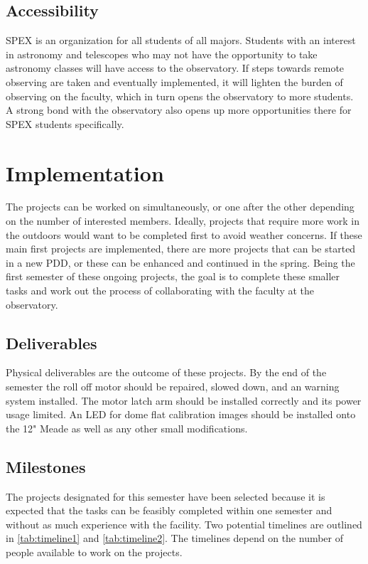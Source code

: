 \documentclass[conference]{IEEEtran} %
\begin{document}
\subsection{Accessibility}
\label{subsec:plug-n-play}
SPEX is an organization for all students of all majors.
Students with an interest in astronomy and telescopes who may not have the opportunity to take astronomy classes will have access to the observatory.
If steps towards remote observing are taken and eventually implemented, it will lighten the burden of observing on the faculty, which in turn opens the observatory to more students.
A strong bond with the observatory also opens up more opportunities there for SPEX students specifically.

\section{Implementation}
\label{sec:implementation}

 The projects can be worked on simultaneously, or one after the other depending on the number of interested members.
 Ideally, projects that require more work in the outdoors would want to be completed first to avoid weather concerns.
 If these main first projects are implemented, there are more projects that can be started in a new PDD, or these can be enhanced and continued in the spring.
 Being the first semester of these ongoing projects, the goal is to complete these smaller tasks and work out the process of collaborating with the faculty at the observatory.

\subsection{Deliverables}
\label{subsec:deliverables}
  Physical deliverables are the outcome of these projects.
  By the end of the semester the roll off motor should be repaired, slowed down, and an warning system installed.
  The motor latch arm should be installed correctly and its power usage limited.
  An LED for dome flat calibration images should be installed onto the 12" Meade as well as any other small modifications.

\subsection{Milestones}
\label{subsec:milestones}
  The projects designated for this semester have been selected because it is expected that the tasks can be feasibly completed within one semester and without as much experience with the facility.
  Two potential timelines are outlined in \autoref{tab:timeline1} and \autoref{tab:timeline2}.
  The timelines depend on the number of people available to work on the projects.
\end{document}
